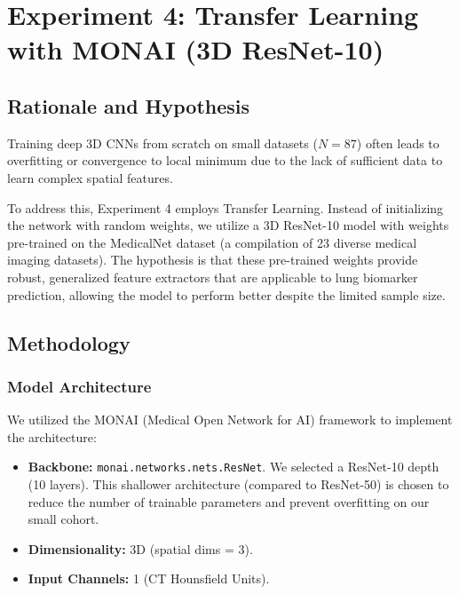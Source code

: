 \section{Experiment 4: Transfer Learning with MONAI (3D ResNet-10)}

\subsection{Rationale and Hypothesis}
Training deep 3D CNNs from scratch on small datasets ($N=87$) often leads to overfitting or convergence to local minimum due to the lack of sufficient data to learn complex spatial features. 

To address this, Experiment 4 employs Transfer Learning. Instead of initializing the network with random weights, we utilize a 3D ResNet-10 model with weights pre-trained on the MedicalNet dataset (a compilation of 23 diverse medical imaging datasets). The hypothesis is that these pre-trained weights provide robust, generalized feature extractors that are applicable to lung biomarker prediction, allowing the model to perform better despite the limited sample size.

\subsection{Methodology}

\subsubsection{Model Architecture}
We utilized the MONAI (Medical Open Network for AI) framework to implement the architecture:
\begin{itemize}
    \item \textbf{Backbone:} \texttt{monai.networks.nets.ResNet}. We selected a ResNet-10 depth (10 layers). This shallower architecture (compared to ResNet-50) is chosen to reduce the number of trainable parameters and prevent overfitting on our small cohort.
    \item \textbf{Dimensionality:} 3D (spatial dims = 3).
    \item \textbf{Input Channels:} 1 (CT Hounsfield Units).
\end{itemize}

